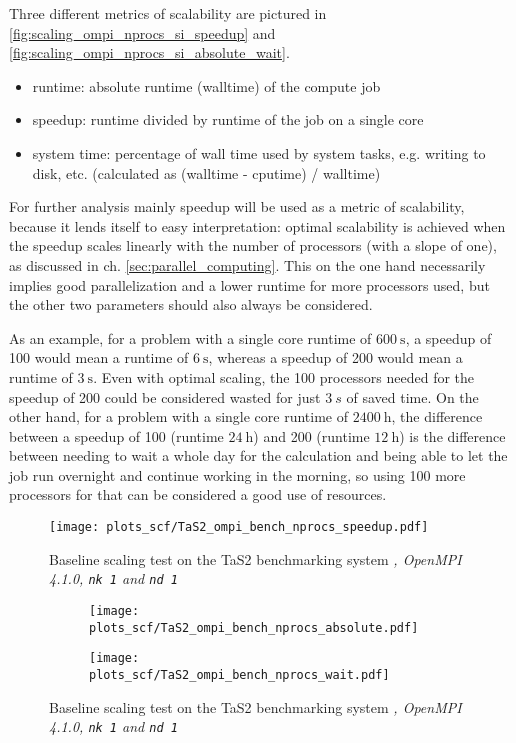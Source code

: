 \documentclass[main.tex]{subfiles}
\begin{document}
Three different metrics of scalability are pictured in \ref{fig:scaling_ompi_nprocs_si_speedup} and \ref{fig:scaling_ompi_nprocs_si_absolute_wait}. 
\begin{itemize}
    \item runtime: absolute runtime (walltime) of the compute job
    \item speedup: runtime divided by runtime of the job on a single core
    \item system time: percentage of wall time used by system tasks, e.g. writing to disk, etc. (calculated as (walltime - cputime) / walltime)
\end{itemize}

For further analysis mainly speedup will be used as a metric of scalability, because it lends itself to easy interpretation: optimal scalability is achieved when the speedup scales linearly with the number of processors (with a slope of one), as discussed in ch. \ref{sec:parallel_computing}.
This on the one hand necessarily implies good parallelization and a lower runtime for more processors used, but the other two parameters should also always be considered.

As an example, for a problem with a single core runtime of \(\SI{600}{\s}\), a speedup of 100 would mean a runtime of \(\SI{6}{\s}\), whereas a speedup of 200 would mean a runtime of \(\SI{3}{\s}\).
Even with optimal scaling, the 100 processors needed for the speedup of 200 could be considered wasted for just \(\SI{3}{s}\) of saved time.
On the other hand, for a problem with a single core runtime of \(\SI{2400}{\hour}\), the difference between a speedup of 100 (runtime \(\SI{24}{\hour}\)) and 200 (runtime \(\SI{12}{\hour}\)) is the difference between needing to wait a whole day for the calculation and being able to let the job run overnight and continue working in the morning, so using 100 more processors for that can be considered a good use of resources. 

\begin{figure}[ht!]
\centering
\texttt{[image: plots\_scf/TaS2\_ompi\_bench\_nprocs\_speedup.pdf]}
\caption{Baseline scaling test on the TaS2 benchmarking system \emph{, OpenMPI 4.1.0, \texttt{nk 1} and \texttt{nd 1}}}
\label{fig:scaling_ompi_nprocs_tas2_speedup}
\end{figure}

\begin{figure}[ht!]
\begin{subfigure}[b]{0.49\textwidth}
    \centering
    \texttt{[image: plots\_scf/TaS2\_ompi\_bench\_nprocs\_absolute.pdf]}
\end{subfigure}
\begin{subfigure}[b]{0.49\textwidth}
    \centering
    \texttt{[image: plots\_scf/TaS2\_ompi\_bench\_nprocs\_wait.pdf]}
\end{subfigure}
\caption{Baseline scaling test on the TaS2 benchmarking system \emph{, OpenMPI 4.1.0, \texttt{nk 1} and \texttt{nd 1}}}
\label{fig:scaling_ompi_nprocs_tas2_absolute_wait}
\end{figure}
\end{document}
